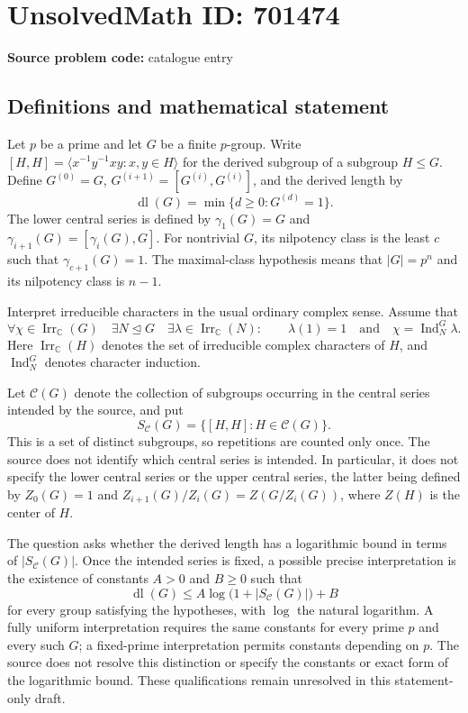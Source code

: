 \documentclass[11pt]{article}
\newcommand{\C}{\mathbb{C}}
\begin{document}
\section*{UnsolvedMath ID: 701474}
\textbf{Source problem code:} catalogue entry
\subsection{Definitions and mathematical statement}
Let \(p\) be a prime and let \(G\) be a finite \(p\)-group. Write \([H,H]=\langle x^{-1}y^{-1}xy:x,y\in H\rangle\) for the derived subgroup of a subgroup \(H\leq G\). Define \(G^{(0)}=G\), \(G^{(i+1)}=[G^{(i)},G^{(i)}]\), and the derived length by
\[
\operatorname{dl}(G)=\min\{d\geq 0:G^{(d)}=1\}.
\]
The lower central series is defined by \(\gamma_1(G)=G\) and \(\gamma_{i+1}(G)=[\gamma_i(G),G]\). For nontrivial \(G\), its nilpotency class is the least \(c\) such that \(\gamma_{c+1}(G)=1\). The maximal-class hypothesis means that \(|G|=p^n\) and its nilpotency class is \(n-1\).

Interpret irreducible characters in the usual ordinary complex sense. Assume that
\[
\forall\chi\in\operatorname{Irr}_{\C}(G)\quad
\exists N\trianglelefteq G\quad
\exists\lambda\in\operatorname{Irr}_{\C}(N):\qquad
\lambda(1)=1\quad\text{and}\quad\chi=\operatorname{Ind}_{N}^{G}\lambda.
\]
Here \(\operatorname{Irr}_{\C}(H)\) denotes the set of irreducible complex characters of \(H\), and \(\operatorname{Ind}_{N}^{G}\) denotes character induction.

Let \(\mathcal C(G)\) denote the collection of subgroups occurring in the central series intended by the source, and put
\[
S_{\mathcal C}(G)=\{[H,H]:H\in\mathcal C(G)\}.
\]
This is a set of distinct subgroups, so repetitions are counted only once. The source does not identify which central series is intended. In particular, it does not specify the lower central series or the upper central series, the latter being defined by \(Z_0(G)=1\) and \(Z_{i+1}(G)/Z_i(G)=Z(G/Z_i(G))\), where \(Z(H)\) is the center of \(H\).

The question asks whether the derived length has a logarithmic bound in terms of \(|S_{\mathcal C}(G)|\). Once the intended series is fixed, a possible precise interpretation is the existence of constants \(A>0\) and \(B\geq0\) such that
\[
\operatorname{dl}(G)\leq A\log\bigl(1+|S_{\mathcal C}(G)|\bigr)+B
\]
for every group satisfying the hypotheses, with \(\log\) the natural logarithm. A fully uniform interpretation requires the same constants for every prime \(p\) and every such \(G\); a fixed-prime interpretation permits constants depending on \(p\). The source does not resolve this distinction or specify the constants or exact form of the logarithmic bound. These qualifications remain unresolved in this statement-only draft.
\end{document}
